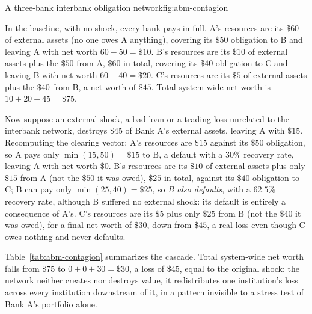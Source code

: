 \documentclass[../ai_in_finance]{subfiles}
\begin{document}
\begin{bookfigure}[htbp]{A three-bank interbank obligation network}{fig:abm-contagion}
\end{bookfigure}

In the baseline, with no shock, every bank pays in full. A's resources are its $\$60$ of external assets (no one owes A anything), covering its $\$50$ obligation to B and leaving A with net worth $60-50=\$10$. B's resources are its $\$10$ of external assets plus the $\$50$ from A, $\$60$ in total, covering its $\$40$ obligation to C and leaving B with net worth $60-40=\$20$. C's resources are its $\$5$ of external assets plus the $\$40$ from B, a net worth of $\$45$. Total system-wide net worth is $10+20+45=\$75$.

Now suppose an external shock, a bad loan or a trading loss unrelated to the interbank network, destroys $\$45$ of Bank A's external assets, leaving A with $\$15$. Recomputing the clearing vector: A's resources are $\$15$ against its $\$50$ obligation, so A pays only $\min(15,50)=\$15$ to B, a default with a $30\%$ recovery rate, leaving A with net worth $\$0$. B's resources are its $\$10$ of external assets plus only $\$15$ from A (not the $\$50$ it was owed), $\$25$ in total, against its $\$40$ obligation to C; B can pay only $\min(25,40)=\$25$, so \emph{B also defaults}, with a $62.5\%$ recovery rate, although B suffered no external shock: its default is entirely a consequence of A's. C's resources are its $\$5$ plus only $\$25$ from B (not the $\$40$ it was owed), for a final net worth of $\$30$, down from $\$45$, a real loss even though C owes nothing and never defaults.

Table~\ref{tab:abm-contagion} summarizes the cascade. Total system-wide net worth falls from $\$75$ to $0+0+30=\$30$, a loss of $\$45$, equal to the original shock: the network neither creates nor destroys value, it redistributes one institution's loss across every institution downstream of it, in a pattern invisible to a stress test of Bank A's portfolio alone.
\end{document}
